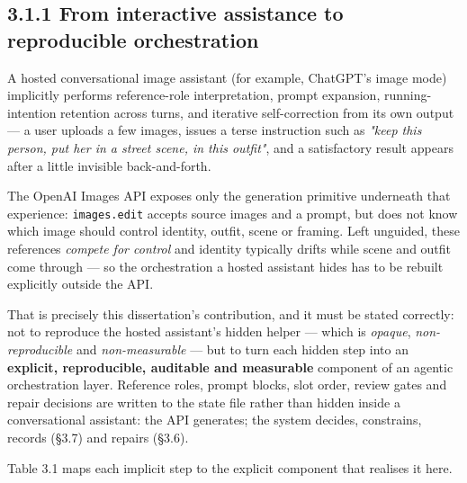 \documentclass[10pt,twocolumn,letterpaper]{article}
\begin{document}

\subsection*{3.1.1 From interactive assistance to reproducible orchestration}

A hosted conversational image assistant (for example, ChatGPT's image mode) implicitly performs reference-role interpretation, prompt expansion, running-intention retention across turns, and iterative self-correction from its own output --- a user uploads a few images, issues a terse instruction such as \emph{"keep this person, put her in a street scene, in this outfit"}, and a satisfactory result appears after a little invisible back-and-forth.

The OpenAI Images API exposes only the generation primitive underneath that experience: \texttt{images.edit} accepts source images and a prompt, but does not know which image should control identity, outfit, scene or framing. Left unguided, these references \emph{compete for control} and identity typically drifts while scene and outfit come through --- so the orchestration a hosted assistant hides has to be rebuilt explicitly outside the API.

That is precisely this dissertation's contribution, and it must be stated correctly: not to reproduce the hosted assistant's hidden helper --- which is \emph{opaque}, \emph{non-reproducible} and \emph{non-measurable} --- but to turn each hidden step into an \textbf{explicit, reproducible, auditable and measurable} component of an agentic orchestration layer. Reference roles, prompt blocks, slot order, review gates and repair decisions are written to the state file rather than hidden inside a conversational assistant: the API generates; the system decides, constrains, records (\S{}3.7) and repairs (\S{}3.6).

Table 3.1 maps each implicit step to the explicit component that realises it here.
\end{document}
